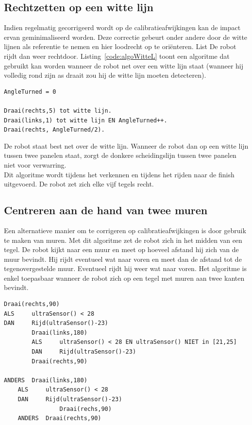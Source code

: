 \documentclass[tt3]{penoverslag}
\begin{document}
\subsection{Rechtzetten op een witte lijn} %
\label{ssec:algoWitteL}
Indien regelmatig gecorrigeerd wordt op de calibratieafwijkingen kan de impact ervan geminimaliseerd worden. Deze correctie gebeurt onder andere door de witte lijnen als referentie te nemen en hier loodrecht op te ori\"enteren. List De robot rijdt dan weer rechtdoor. Listing~\ref{code:algoWitteL} toont een algoritme dat gebruikt kan worden wanneer de robot net over een witte lijn staat (wanneer hij volledig rond zijn as draait zou hij de witte lijn moeten detecteren).

\lstset{frame=single, caption=Witte Lijnalgoritme (pseudocode),
		label=code:algoWitteL, numbers=left, numberstyle=\footnotesize,
		basicstyle=\sffamily, numbersep=5pt}
\begin{lstlisting}
AngleTurned = 0

Draai(rechts,5) tot witte lijn.
Draai(links,1) tot witte lijn EN AngleTurned++.
Draai(rechts, AngleTurned/2).
\end{lstlisting}

De robot staat best net over de witte lijn. Wanneer de robot dan op een witte lijn tussen twee panelen staat, zorgt de donkere scheidingslijn tussen twee panelen niet voor verwarring.\\

Dit algoritme wordt tijdens het verkennen en tijdens het rijden naar de finish uitgevoerd. De robot zet zich elke vijf tegels recht.

\subsection{Centreren aan de hand van twee muren} %
\label{ssec:algoMuren}
Een alternatieve manier om te corrigeren op calibratieafwijkingen is door gebruik te maken van muren. Met dit algoritme zet de robot zich in het midden van een tegel. De robot kijkt naar een muur en meet op hoeveel afstand hij zich van de muur bevindt. Hij rijdt eventueel wat naar voren en meet dan de afstand tot de tegenovergestelde muur. Eventueel rijdt hij weer wat naar voren. Het algoritme is enkel toepasbaar wanneer de robot zich op een tegel met muren aan twee kanten bevindt.

\lstset{frame=single, caption=Muuralgoritme (pseudocode),
		label=code:algoWitteL, numbers=left, numberstyle=\footnotesize,
		basicstyle=\sffamily, numbersep=5pt}
\begin{lstlisting}
Draai(rechts,90)
ALS     ultraSensor() < 28
DAN 	Rijd(ultraSensor()-23)
    	Draai(links,180)
    	ALS 	ultraSensor() < 28 EN ultraSensor() NIET in [21,25]
        DAN 	Rijd(ultraSensor()-23)
		Draai(rechts,90)
		
ANDERS 	Draai(links,180)
	ALS 	ultraSensor() < 28
	DAN     Rijd(ultraSensor()-23)
       	        Draai(rechs,90)
	ANDERS	Draai(rechts,90)
\end{lstlisting}
\end{document}

